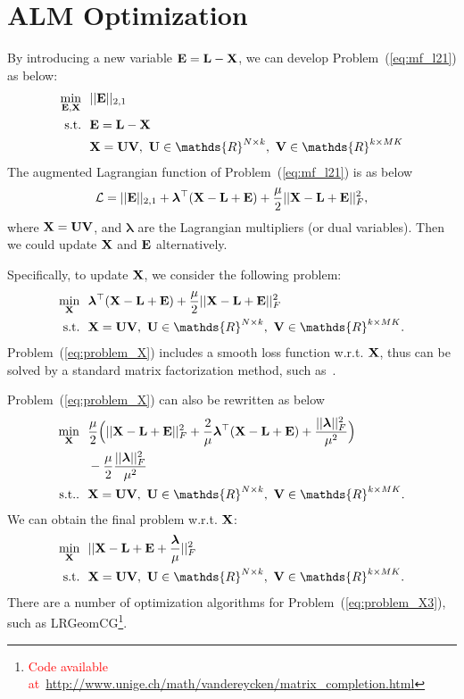 \documentclass[letterpaper]{article}
\def\bE{{\bf E}}
\def\blambda{{\bm \lambda}}
\def\calL{{\mathcal{L}}}
\def\bL{{\bf L}}
\def\bU{{\bf U}}
\def\bV{{\bf V}}
\def\dsR{\mathds{R}}
\def\bX{{\bf X}}
\def\bX{{\bf X}}
\def\st{{\text{s.t.}}}
\def\yanred{\textcolor{red}}
\begin{document}
\section{ALM Optimization}

By introducing a new variable $\bE = \bL - \bX$, we can develop Problem~(\ref{eq:mf_l21}) as below:
\begin{align}\label{eq:mf_l21_constrained}
  \min_{\bE, \bX} ~&~ || \bE ||_{2,1}   \nonumber \\
  \st             ~&~ \bE = \bL - \bX   \nonumber \\
                  ~&~ \bX = \bU \bV,~\bU \in \dsR^{N \times k},~\bV \in \dsR^{k \times MK}
\end{align}
The augmented Lagrangian function of Problem~(\ref{eq:mf_l21}) is as below
\begin{align}\label{eq:lagrangian_l21}
  \calL = || \bE ||_{2,1} + \blambda^{\top} (\bX - \bL + \bE) + \frac{\mu}{2} || \bX - \bL + \bE ||_F^2   ,
\end{align}
\noindent
where $\bX = \bU \bV$,
and $\blambda$ are the Lagrangian multipliers (or dual variables).
Then we could update $\bX$ and $\bE$ alternatively.


Specifically, to update $\bX$, we consider the following problem:
\begin{align}\label{eq:problem_X}
  \min_{\bX} ~&~ \blambda^{\top} (\bX - \bL + \bE) + \frac{\mu}{2} || \bX - \bL + \bE ||_F^2  \nonumber  \\
  \st        ~&~ \bX = \bU \bV,~\bU \in \dsR^{N \times k},~\bV \in \dsR^{k \times MK}   .
\end{align}
Problem~(\ref{eq:problem_X}) includes a smooth loss function w.r.t. $\bX$, thus can be solved by a standard matrix factorization method, such as~\cite{yanijcai2015scalable,tanicml2014riemannian,vandereyckensiamjo2013low}.


Problem~(\ref{eq:problem_X}) can also be rewritten as below
\begin{align}\label{eq:problem_X2}
  \min_{\bX} ~&~ \frac{\mu}{2} \Big( || \bX - \bL + \bE ||_F^2 + \frac{2}{\mu} \blambda^{\top} (\bX - \bL + \bE) + \frac{|| \blambda ||_F^2}{\mu^2} \Big)    \nonumber   \\
             ~&~ - \frac{\mu}{2} \frac{|| \blambda ||_F^2}{\mu^2}   \nonumber \\
  \st.       ~&~ \bX = \bU \bV,~\bU \in \dsR^{N \times k},~\bV \in \dsR^{k \times MK}   .
\end{align}
\noindent
We can obtain the final problem w.r.t. $\bX$:
\begin{align}\label{eq:problem_X3}
  \min_{\bX} ~&~ || \bX - \bL + \bE + \frac{\blambda}{\mu} ||_F^2   \nonumber \\
  \st        ~&~ \bX = \bU \bV,~\bU \in \dsR^{N \times k},~\bV \in \dsR^{k \times MK}   .
\end{align}
\noindent
There are a number of optimization algorithms for Problem~(\ref{eq:problem_X3}), such as LRGeomCG\footnote{\yanred{Code available at~\url{http://www.unige.ch/math/vandereycken/matrix_completion.html}}}.
\end{document}
